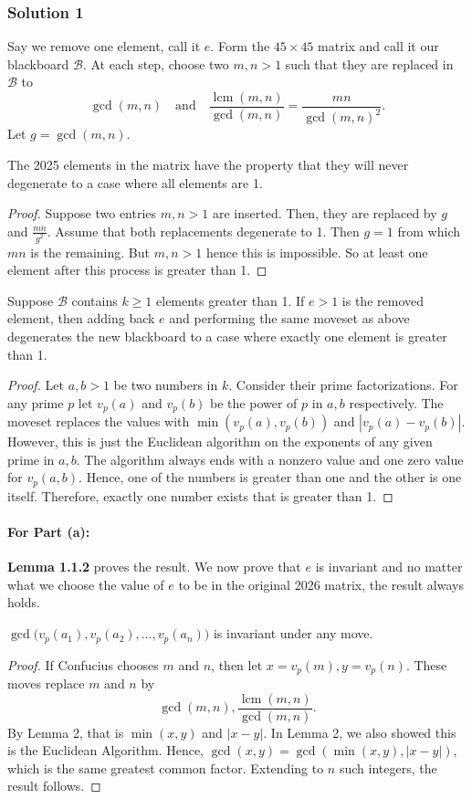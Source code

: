 \documentclass[11pt]{article}
\begin{document}
\subsubsection{Solution 1}
Say we remove one element, call it $e$. Form the $45 \times 45$ matrix and call it our blackboard $\mathcal{B}$. At each step, choose two $m,n > 1$ such that they are replaced in $\mathcal{B}$ to\[\gcd(m,n)\quad\text{and}\quad\frac{\operatorname{lcm}(m,n)}{\gcd(m,n)}=\frac{mn}{\gcd(m,n)^2}.\]
Let $g = \gcd(m,n)$.
\begin{lemma}
    The 2025 elements in the matrix have the property that they will never degenerate to a case where all elements are 1.
\end{lemma}
\begin{proof}
    Suppose two entries $m,n > 1$ are inserted. Then, they are replaced by $g$ and $\frac{mn}{g^2}$. Assume that both replacements degenerate to 1. Then $g = 1$ from which $mn$ is the remaining. But $m,n > 1$ hence this is impossible. So at least one element after this process is greater than 1.
\end{proof}
\begin{lemma}
    Suppose $\mathcal{B}$ contains $k \geq 1$ elements greater than 1. If $e > 1$ is the removed element, then adding back $e$ and performing the same moveset as above degenerates the new blackboard to a case where exactly one element is greater than 1.
\end{lemma}
\begin{proof}
    Let $a,b > 1$ be two numbers in $k$. Consider their prime factorizations. For any prime $p$ let $v_p(a)$ and $v_p(b)$ be the power of $p$ in $a,b$ respectively. The moveset replaces the values with $\min(v_p(a),v_p(b))$ and $|v_p(a)-v_p(b)|$. However, this is just the Euclidean algorithm on the exponents of any given prime in $a,b$. The algorithm always ends with a nonzero value and one zero value for $v_p(a,b)$. Hence, one of the numbers is greater than one and the other is one itself. Therefore, exactly one number exists that is greater than 1.
\end{proof}
\paragraph{For Part (a):} \textcolor{BrightAqua}{\textbf{Lemma 1.1.2}} proves the result. We now prove that $e$ is invariant and no matter what we choose the value of $e$ to be in the original 2026 matrix, the result always holds.
\begin{lemma}
$\gcd\bigl(v_p(a_1),v_p(a_2),\dots,v_p(a_n)\bigr)$ is invariant under any move.
\end{lemma}
\begin{proof}
    If Confucius chooses $m$ and $n$, then let $x=v_p(m), y=v_p(n)$. These moves replace $m$ and $n$ by $$\gcd(m,n), \frac{\operatorname{lcm}(m,n)}{\gcd(m,n)}.$$ By Lemma 2, that is $\min(x,y)$ and $|x-y|$. In Lemma 2, we also showed this is the Euclidean Algorithm. Hence, $\gcd(x,y)=\gcd(\min(x,y),|x-y|)$, which is the same greatest common factor. Extending to $n$ such integers, the result follows.
\end{proof}
\end{document}

